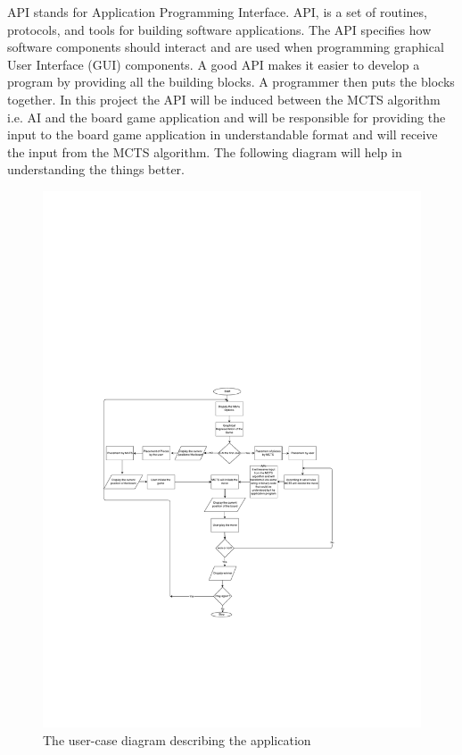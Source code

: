 API stands for Application Programming Interface. API, is a set of routines, protocols, and tools for building software applications. The API specifies how software components should interact and are used when programming graphical User Interface (GUI) components. A good API makes it easier to develop a program by providing all the building blocks. A programmer then puts the blocks together.\bigbreak
 In this project the API will be induced between the MCTS algorithm i.e. AI and the board game application and will be responsible for providing the input to the board game application in understandable format and will receive the input from the MCTS algorithm. The following diagram will help in understanding the things better.

\bigbreak

\begin{figure}[!h]
\centering
\includegraphics[width=1.7\textwidth]{2General_Architecture/2.2API/flow.pdf}
\caption{The user-case diagram describing the application}
\label{fig:pieces}
\end{figure}


